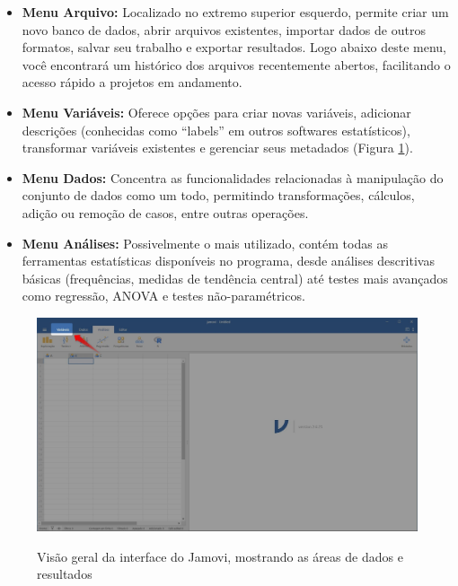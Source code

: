 \begin{itemize}
    \item \textbf{Menu Arquivo:} Localizado no extremo superior esquerdo, permite criar um novo banco de dados, abrir arquivos existentes, importar dados de outros formatos, salvar seu trabalho e exportar resultados. Logo abaixo deste menu, você encontrará um histórico dos arquivos recentemente abertos, facilitando o acesso rápido a projetos em andamento.

    \item \textbf{Menu Variáveis:} Oferece opções para criar novas variáveis, adicionar descrições (conhecidas como ``labels'' em outros softwares estatísticos), transformar variáveis existentes e gerenciar seus metadados (Figura \ref{fig:interface_jamovi_1}).

    \item \textbf{Menu Dados:} Concentra as funcionalidades relacionadas à manipulação do conjunto de dados como um todo, permitindo transformações, cálculos, adição ou remoção de casos, entre outras operações.

    \item \textbf{Menu Análises:} Possivelmente o mais utilizado, contém todas as ferramentas estatísticas disponíveis no programa, desde análises descritivas básicas (frequências, medidas de tendência central) até testes mais avançados como regressão, ANOVA e testes não-paramétricos.
\end{itemize}

\begin{figure}[H]
    \centering
    \caption{Visão geral da interface do Jamovi, mostrando as áreas de dados e resultados}
    \includegraphics[width=\textwidth]{imagens/cap_2/interface_jamovi_1.jpg}
    \label{fig:interface_jamovi_1}
\end{figure}

